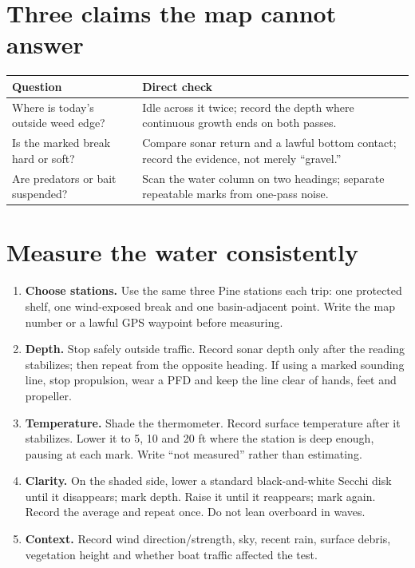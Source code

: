 \section{Three claims the map cannot answer}
\begin{tabularx}{\linewidth}{@{}X X@{}}
\toprule
\textbf{Question} & \textbf{Direct check}\\
\midrule
Where is today's outside weed edge? & Idle across it twice; record the depth
where continuous growth ends on both passes.\\
Is the marked break hard or soft? & Compare sonar return and a lawful bottom
contact; record the evidence, not merely ``gravel.''\\
Are predators or bait suspended? & Scan the water column on two headings;
separate repeatable marks from one-pass noise.\\
\bottomrule
\end{tabularx}

\newpage
\section{Measure the water consistently}

\begin{enumerate}
\item \textbf{Choose stations.} Use the same three Pine stations each trip:
one protected shelf, one wind-exposed break and one basin-adjacent point.
Write the map number or a lawful GPS waypoint before measuring.
\item \textbf{Depth.} Stop safely outside traffic. Record sonar depth only
after the reading stabilizes; then repeat from the opposite heading. If using
a marked sounding line, stop propulsion, wear a PFD and keep the line clear of
hands, feet and propeller.
\item \textbf{Temperature.} Shade the thermometer. Record surface temperature
after it stabilizes. Lower it to 5, 10 and 20 ft where the station is deep
enough, pausing at each mark. Write ``not measured'' rather than estimating.
\item \textbf{Clarity.} On the shaded side, lower a standard black-and-white
Secchi disk until it disappears; mark depth. Raise it until it reappears; mark
again. Record the average and repeat once. Do not lean overboard in waves.
\item \textbf{Context.} Record wind direction/strength, sky, recent rain,
surface debris, vegetation height and whether boat traffic affected the test.
\end{enumerate}

